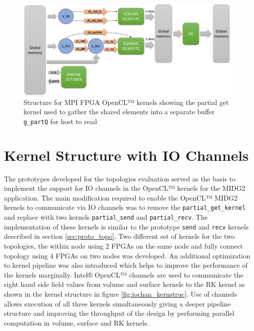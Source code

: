 \begin{figure}[h]%
    \centering
    \includegraphics[width=1.0\textwidth]{images/base_kernstruc}
    \caption{Structure for MPI FPGA OpenCL™ kernels showing the partial get kernel used to gather
     the shared elements into a separate buffer \texttt{g\_partQ} for host to read}
    \label{fig:base_kernstruc}
\end{figure}

\section{Kernel Structure with IO Channels}

The prototypes developed for the topologies evaluation served as the basis to implement
the support for IO channels in the OpenCL™ kernels for the MIDG2 application. The main
modification required to enable the OpenCL™ MIDG2 kernels to communicate via IO channels
was to remove the \texttt{partial\_get\_kernel} and replace with two kernels
\texttt{partial\_send} and \texttt{partial\_recv}. The implementation of these kernels
is similar to the prototype \texttt{send} and \texttt{recv} kernels described in
section \ref{sec:proto_topo}. Two different set of kernels for the two topologies,
the within node using 2 FPGAs on the same node and fully connect topology using
4 FPGAs on two nodes was developed. An additional optimization to kernel pipeline
was also introduced which helps to improve the performance of the kernels marginally.
Intel® OpenCL™ channels are used to communicate the right hand side field values
from volume and surface kernels to the RK kernel as shown in the kernel structure
in figure \ref{fig:iochan_kernstruc}. Use of channels allows execution of all three
kernels simultaneously giving a deeper pipeline structure and improving the throughput
of the design by performing parallel computation in volume, surface and RK kernels.

